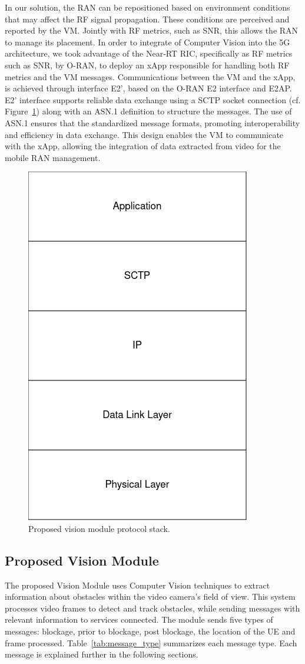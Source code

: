 In our solution, the RAN can be repositioned based on environment conditions that may affect the RF signal propagation\@.
These conditions are perceived and reported by the VM\@.
Jointly with RF metrics, such as SNR, this allows the RAN to manage its placement.
In order to integrate of Computer Vision into the 5G architecture, we took advantage of the Near-RT RIC, specifically as RF metrics such as SNR, by O-RAN, to deploy an xApp responsible for handling both RF metrics and the VM messages.
Communications between the VM and the xApp, is achieved through interface E2', based on the O-RAN E2 interface and E2AP\@.
E2' interface supports reliable data exchange using a SCTP socket connection (cf.
Figure~\ref{fig:stack}) along with an ASN.1 definition to structure the messages.
The use of ASN.1 ensures that the standardized message formats, promoting interoperability and efficiency in data exchange.
This design enables the VM to communicate with the xApp, allowing the integration of data extracted from video for the mobile RAN management.

\begin{figure}[H]
    \centering
    \includegraphics[width=0.2\linewidth]{figures/VisionModule_ProtocolStack.drawio(2)}
    \caption[Proposed Vision Module Protocol Stack]{Proposed vision module protocol stack.}
    \label{fig:stack}
\end{figure}


\subsection{Proposed Vision Module}\label{subsec:prop_vision}
The proposed Vision Module uses Computer Vision techniques to extract information about obstacles within the video camera's field of view.
This system processes video frames to detect and track obstacles, while sending messages with relevant information to services connected.
The module sends five types of messages: blockage, prior to blockage, post blockage, the location of the UE and frame processed.
Table~\ref{tab:message_type} summarizes each message type.
Each message is explained further in the following sections.

